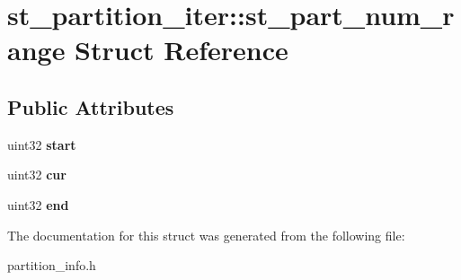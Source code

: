 \hypertarget{structst__partition__iter_1_1st__part__num__range}{}\section{st\+\_\+partition\+\_\+iter\+:\+:st\+\_\+part\+\_\+num\+\_\+range Struct Reference}
\label{structst__partition__iter_1_1st__part__num__range}
\subsection*{Public Attributes}
\begin{DoxyCompactItemize}
\item 
\mbox{\label{structst__partition__iter_1_1st__part__num__range_ae8a0e572726718761dcf0a5a85d6fabe}} 
uint32 {\bfseries start}
\item 
\mbox{\label{structst__partition__iter_1_1st__part__num__range_a184ee3050e170d482f80ac3fd9f7b247}} 
uint32 {\bfseries cur}
\item 
\mbox{\label{structst__partition__iter_1_1st__part__num__range_a597c35f2366180666cedf08d28458889}} 
uint32 {\bfseries end}
\end{DoxyCompactItemize}


The documentation for this struct was generated from the following file\+:\begin{DoxyCompactItemize}
\item 
partition\+\_\+info.\+h\end{DoxyCompactItemize}
